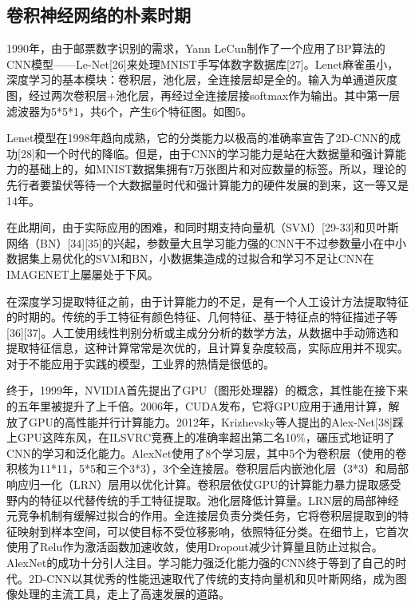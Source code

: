 \documentclass[15pt]{article}
\begin{document}
\subsection{卷积神经网络的朴素时期}
1990年，由于邮票数字识别的需求，Yann LeCun制作了一个应用了BP算法的CNN模型——Le-Net[26]来处理MNIST手写体数字数据库[27]。Lenet麻雀虽小，深度学习的基本模块：卷积层，池化层，全连接层却是全的。输入为单通道灰度图，经过两次卷积层+池化层，再经过全连接层接softmax作为输出。其中第一层滤波器为5*5*1，共6个，产生6个特征图。如图5。

Lenet模型在1998年趋向成熟，它的分类能力以极高的准确率宣告了2D-CNN的成功[28]和一个时代的降临。但是，由于CNN的学习能力是站在大数据量和强计算能力的基础上的，如MNIST数据集拥有7万张图片和对应数量的标签。所以，理论的先行者要蛰伏等待一个大数据量时代和强计算能力的硬件发展的到来，这一等又是14年。

在此期间，由于实际应用的困难，和同时期支持向量机（SVM）[29-33]和贝叶斯网络（BN）[34][35]的兴起，参数量大且学习能力强的CNN干不过参数量小在中小数据集上易优化的SVM和BN，小数据集造成的过拟合和学习不足让CNN在IMAGENET上屡屡处于下风。

在深度学习提取特征之前，由于计算能力的不足，是有一个人工设计方法提取特征的时期的。传统的手工特征有颜色特征、几何特征、基于特征点的特征描述子等[36][37]。人工使用线性判别分析或主成分分析的数学方法，从数据中手动筛选和提取特征信息，这种计算常常是次优的，且计算复杂度较高，实际应用并不现实。对于不能应用于实践的模型，工业界的热情是很低的。

终于，1999年，NVIDIA首先提出了GPU（图形处理器）的概念，其性能在接下来的五年里被提升了上千倍。2006年，CUDA发布，它将GPU应用于通用计算，解放了GPU的高性能并行计算能力。2012年，Krizhevsky等人提出的Alex-Net[38]踩上GPU这阵东风，在ILSVRC竞赛上的准确率超出第二名10\%，碾压式地证明了CNN的学习和泛化能力。AlexNet使用了8个学习层，其中5个为卷积层（使用的卷积核为11*11，5*5和三个3*3），3个全连接层。卷积层后内嵌池化层（3*3）和局部响应归一化（LRN）层用以优化计算。卷积层依仗GPU的计算能力暴力提取感受野内的特征以代替传统的手工特征提取。池化层降低计算量。LRN层的局部神经元竞争机制有缓解过拟合的作用。全连接层负责分类任务，它将卷积层提取到的特征映射到样本空间，可以使目标不受位移影响，依照特征分类。在细节上，它首次使用了Relu作为激活函数加速收敛，使用Dropout减少计算量且防止过拟合。AlexNet的成功十分引人注目。学习能力强泛化能力强的CNN终于等到了自己的时代。2D-CNN以其优秀的性能迅速取代了传统的支持向量机和贝叶斯网络，成为图像处理的主流工具，走上了高速发展的道路。
\end{document}
